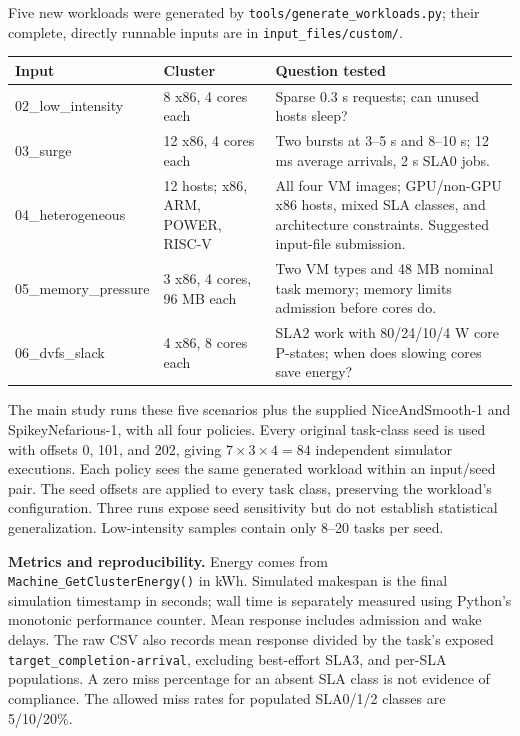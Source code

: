 \documentclass[10pt,letterpaper]{article}
\begin{document}
Five new workloads were generated by \texttt{tools/generate\_workloads.py}; their
complete, directly runnable inputs are in \texttt{input\_files/custom/}.
\begin{center}
\small
\begin{tabular}{p{1.17in}p{1.38in}p{3.75in}}
\toprule
Input & Cluster & Question tested \\
\midrule
02\_low\_intensity & 8 x86, 4 cores each & Sparse 0.3 s requests; can unused hosts sleep? \\
03\_surge & 12 x86, 4 cores each & Two bursts at 3--5 s and 8--10 s; 12 ms average arrivals, 2 s SLA0 jobs. \\
04\_heterogeneous & 12 hosts; x86, ARM, POWER, RISC-V & All four VM images; GPU/non-GPU x86 hosts, mixed SLA classes, and architecture constraints. Suggested input-file submission. \\
05\_memory\_pressure & 3 x86, 4 cores, 96 MB each & Two VM types and 48 MB nominal task memory; memory limits admission before cores do. \\
06\_dvfs\_slack & 4 x86, 8 cores each & SLA2 work with 80/24/10/4 W core P-states; when does slowing cores save energy? \\
\bottomrule
\end{tabular}
\end{center}

The main study runs these five scenarios plus the supplied NiceAndSmooth-1 and
SpikeyNefarious-1, with all four policies. Every original task-class seed is used
with offsets 0, 101, and 202, giving $7\times3\times4=84$ independent simulator
executions. Each policy sees the same generated workload within an input/seed pair.
The seed offsets are applied to every task class, preserving the workload's
configuration. Three runs expose seed sensitivity but do not establish statistical
generalization. Low-intensity samples contain only 8--20 tasks per seed.

\textbf{Metrics and reproducibility.} Energy comes from
\texttt{Machine\_GetClusterEnergy()} in kWh. Simulated makespan is the final
simulation timestamp in seconds; wall time is separately measured using Python's
monotonic performance counter. Mean response includes admission and wake delays.
The raw CSV also records mean response divided by the task's exposed
\texttt{target\_completion-arrival}, excluding best-effort SLA3, and per-SLA
populations. A zero miss percentage for an absent SLA class is not evidence of
compliance. The allowed miss rates for populated SLA0/1/2 classes are 5/10/20\%.
\end{document}
